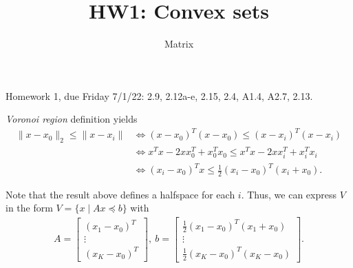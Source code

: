 \documentclass[12pt]{article}
\title{HW1: Convex sets}
\author{Matrix}
\begin{document}
\maketitle

Homework 1, due Friday 7/1/22:  2.9, 2.12a-e, 2.15, 2.4, A1.4, A2.7, 2.13.

\begin{solution}[2.9(a)]

	\textit{Voronoi region} definition yields
    \begin{align*}
			\|x-x_0\|_2\le \|x-x_i\| & \Longleftrightarrow (x-x_0)^T(x-x_0) \le (x-x_i)^T(x-x_i) \\
															 &\Longleftrightarrow x^Tx-2xx_0^T+x_0^Tx_0\le x^Tx-2xx_{i}^T+x_{i}^Tx_{i}\\
															 &\Longleftrightarrow (x_i-x_0)^Tx \le \frac{1}{2}(x_i-x_0)^T(x_i+x_0)
    .\end{align*}
		
		Note that the result above defines a halfspace for each $i$. Thus, we can express  $V$ in the form  $V=\{ x \mid Ax \preceq b\}$ with
		\begin{align*}
			A = \begin{bmatrix} (x_{1}-x_0)^T \\ \vdots \\ (x_{K}-x_0)^T \end{bmatrix} ,\ b=\begin{bmatrix} \frac{1}{2}(x_1-x_0)^T(x_1+x_0) \\ \vdots \\ \frac{1}{2}(x_K-x_0)^T(x_K-x_0) \end{bmatrix} 
		.\end{align*}

\end{solution}
\end{document}
